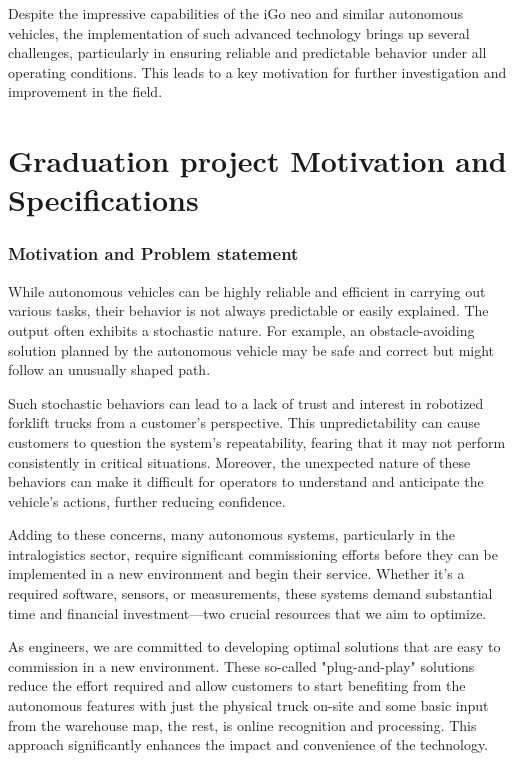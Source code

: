 Despite the impressive capabilities of the iGo neo and similar autonomous vehicles, the implementation 
of such advanced technology brings up several challenges, particularly in ensuring reliable and predictable 
behavior under all operating conditions. This leads to a key motivation for further investigation and improvement 
in the field.

\section{Graduation project Motivation and Specifications}

\subsubsection{Motivation and Problem statement}

While autonomous vehicles can be highly reliable and efficient in carrying out various 
tasks, their behavior is not always predictable or easily explained. The output often 
exhibits a stochastic nature. For example, an obstacle-avoiding solution planned by 
the autonomous vehicle may be safe and correct but might follow an unusually shaped path. 

Such stochastic behaviors can lead to a lack of trust and interest in robotized forklift 
trucks from a customer’s perspective. This unpredictability can cause customers to 
question the system's repeatability, fearing that it may not perform consistently in 
critical situations. Moreover, the unexpected nature of these behaviors can make it 
difficult for operators to understand and anticipate the vehicle's actions, further 
reducing confidence. 

Adding to these concerns, many autonomous systems, particularly in the intralogistics 
sector, require significant commissioning efforts before they can be implemented in 
a new environment and begin their service. Whether it's a required software, sensors, or 
measurements, these systems demand substantial time and financial investment—two 
crucial resources that we aim to optimize. 

As engineers, we are committed to developing optimal solutions that are easy to 
commission in a new environment. These so-called "plug-and-play" solutions reduce 
the effort required and allow customers to start benefiting from the autonomous 
features with just the physical truck on-site and some basic input from the 
warehouse map, the rest, is online recognition and processing. This approach 
significantly enhances the impact and convenience of the technology. 

